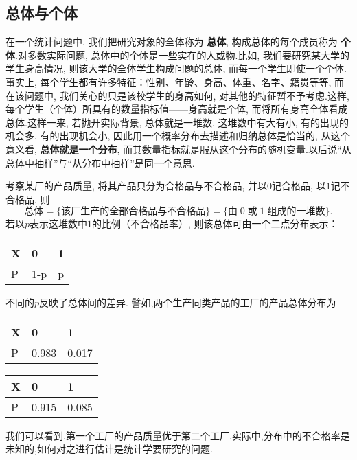 \subsection{总体与个体\label{ssec:5.1.1}}
在一个统计问题中, 我们把研究对象的全体称为 \textbf{总体}, 构成总体的每个成员称为 \textbf{个体}.对多数实际问题, 总体中的个体是一些实在的人或物.比如, 我们要研究某大学的学生身高情况, 则该大学的全体学生构成问题的总体, 而每一个学生即使一个个体.事实上, 每个学生都有许多特征：性别、年龄、身高、体重、名字、籍贯等等, 而在该问题中, 我们关心的只是该校学生的身高如何, 对其他的特征暂不予考虑.这样, 每个学生（个体）所具有的数量指标值——身高就是个体, 而将所有身高全体看成总体.这样一来, 若抛开实际背景, 总体就是一堆数, 这堆数中有大有小, 有的出现的机会多, 有的出现机会小, 因此用一个概率分布去描述和归纳总体是恰当的, 从这个意义看,  \textbf{总体就是一个分布}, 而其数量指标就是服从这个分布的随机变量.以后说``从总体中抽样''与``从分布中抽样''是同一个意思.
\begin{example}\label{exam:5.1.1}
考察某厂的产品质量, 将其产品只分为合格品与不合格品, 并以$0$记合格品, 以$1$记不合格品, 则
\[\text{总体}=\{\text{该厂生产的全部合格品与不合格品}\}=\{\text{由}\;0\;\text{或}\;1\;\text{组成的一堆数}\}.\]
若以$p$表示这堆数中$1$的比例（不合格品率）, 则该总体可由一个二点分布表示：
\begin{center}
\begin{tabularx}{0.4\textwidth}{Y|YY}
  X&0&1\\
  \midrule
  P&1-p&p
  \end{tabularx}
\end{center}
不同的$p$反映了总体间的差异. 譬如,两个生产同类产品的工厂的产品总体分布为

\begin{minipage}{0.4\textwidth}
\centering
\begin{tabularx}{\textwidth}{Y|YY}
X&0&1\\
\midrule
P&0.983&0.017
\end{tabularx}
\end{minipage}\hspace{3\ccwd}
\begin{minipage}{0.4\textwidth}
\centering
\begin{tabularx}{\textwidth}{Y|YY}
X&0&1\\
\midrule
P&0.915&0.085
\end{tabularx}
\end{minipage}

我们可以看到,第一个工厂的产品质量优于第二个工厂.实际中,分布中的不合格率是未知的,如何对之进行估计是统计学要研究的问题.
\end{example}
